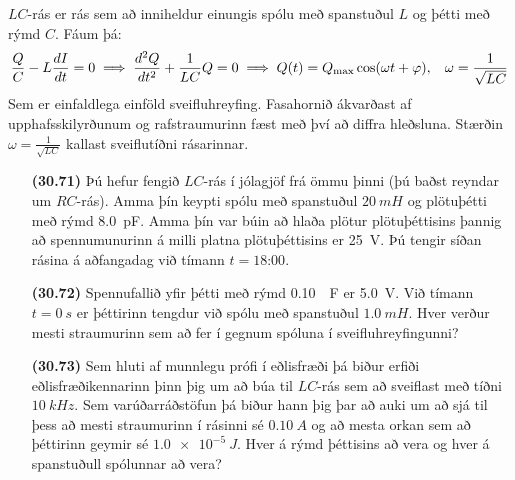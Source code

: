 \ifdefined \wholebook \else\documentclass[oneside]{book}\usepackage{EdlBook}\graphicspath{{figures/}}
\begin{document}
\begin{tcolorbox}
$LC$-rás er rás sem að inniheldur einungis spólu með spanstuðul $L$ og þétti með rýmd $C$. Fáum þá:
\begin{align*}
    \frac{Q}{C} - L \frac{dI}{dt} = 0 \implies \frac{d^2Q}{dt^2} + \frac{1}{LC} Q = 0 \implies Q(t) = Q_{\text{max}}\cos(\omega t + \varphi), \hspace{0.3cm} \omega = \frac{1}{\sqrt{LC}}
\end{align*}
Sem er einfaldlega einföld sveifluhreyfing. Fasahornið ákvarðast af upphafsskilyrðunum og rafstraumurinn fæst með því að diffra hleðsluna. Stærðin $\omega = \frac{1}{\sqrt{LC}}$ kallast sveiflutíðni rásarinnar.
\end{tcolorbox}

\begin{enumerate}[label = \textbf{(\alph*)}]

\item[\textbf{(30.71)}] Þú hefur fengið $LC$-rás í jólagjöf frá ömmu þinni (þú baðst reyndar um $RC$-rás). Amma þín keypti spólu með spanstuðul $\SI{20}{mH}$ og plötuþétti með rýmd \SI{8.0}{pF}. Amma þín var búin að hlaða plötur plötuþéttisins þannig að spennumunurinn á milli platna plötuþéttisins er \SI{25}{V}. Þú tengir síðan rásina á aðfangadag við tímann $t = \text{18:00}$. 

\item[\textbf{(30.72)}] Spennufallið yfir þétti með rýmd \SI{0.10}{\mu F} er \SI{5.0}{V}. Við tímann $t = \SI{0}{s}$ er þéttirinn tengdur við spólu með spanstuðul $\SI{1.0}{mH}$. Hver verður mesti straumurinn sem að fer í gegnum spóluna í sveifluhreyfingunni?

\item[\textbf{(30.73)}] Sem hluti af munnlegu prófi í eðlisfræði þá biður erfiði eðlisfræðikennarinn þinn þig um að búa til $LC$-rás sem að sveiflast með tíðni $\SI{10}{kHz}$. Sem varúðarráðstöfun þá biður hann þig þar að auki um að sjá til þess að mesti straumurinn í rásinni sé $\SI{0.10}{A}$ og að mesta orkan sem að þéttirinn geymir sé $\SI{1.0e-5}{J}$. Hver á rýmd þéttisins að vera og hver á spanstuðull spólunnar að vera?


\end{enumerate}
\end{document}
